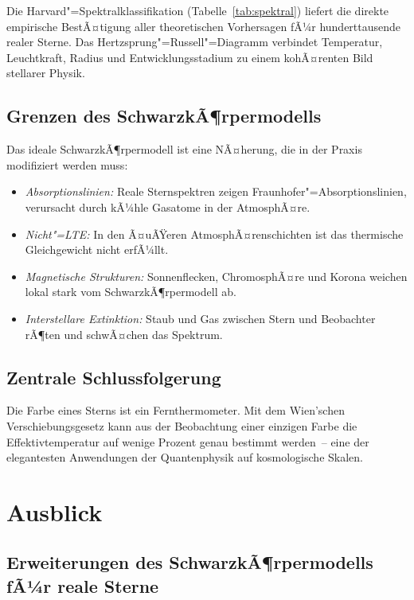 ﻿\documentclass[a4paper,12pt]{article}
\theoremstyle{definition}
\begin{document}
Die Harvard"=Spektralklassifikation (Tabelle~\ref{tab:spektral}) liefert
die direkte empirische BestÃ¤tigung aller theoretischen Vorhersagen fÃ¼r
hunderttausende realer Sterne. Das Hertzsprung"=Russell"=Diagramm
verbindet Temperatur, Leuchtkraft, Radius und Entwicklungsstadium
zu einem kohÃ¤renten Bild stellarer Physik.

\subsection{Grenzen des SchwarzkÃ¶rpermodells}

Das ideale SchwarzkÃ¶rpermodell ist eine NÃ¤herung, die in der Praxis
modifiziert werden muss:
\begin{itemize}
    \item \emph{Absorptionslinien:} Reale Sternspektren zeigen Fraunhofer"=Absorptionslinien,
          verursacht durch kÃ¼hle Gasatome in der AtmosphÃ¤re.
    \item \emph{Nicht"=LTE:} In den Ã¤uÃŸeren AtmosphÃ¤renschichten ist das
          thermische Gleichgewicht nicht erfÃ¼llt.
    \item \emph{Magnetische Strukturen:} Sonnenflecken, ChromosphÃ¤re und
          Korona weichen lokal stark vom SchwarzkÃ¶rpermodell ab.
    \item \emph{Interstellare Extinktion:} Staub und Gas zwischen Stern und
          Beobachter rÃ¶ten und schwÃ¤chen das Spektrum.
\end{itemize}

\subsection{Zentrale Schlussfolgerung}

Die Farbe eines Sterns ist ein Fernthermometer. Mit dem Wien'schen
Verschiebungsgesetz kann aus der Beobachtung einer einzigen Farbe die
Effektivtemperatur auf wenige Prozent genau bestimmt werden~-- eine
der elegantesten Anwendungen der Quantenphysik auf kosmologische Skalen.

\section{Ausblick}

\subsection{Erweiterungen des SchwarzkÃ¶rpermodells fÃ¼r reale Sterne}
\end{document}
